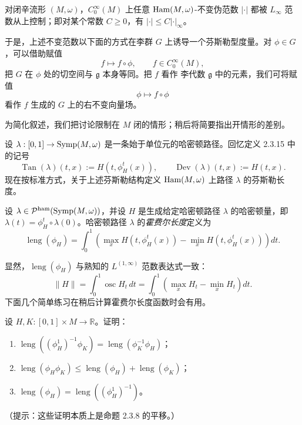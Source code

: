 \begin{theorem}\label{thm:buhovsky-ostrover-pseudonorm}
对闭辛流形 $(M,\omega)$，$C_0^\infty(M)$ 上任意
$\operatorname{Ham}(M,\omega)$-不变伪范数 $|\mathord\cdot|$ 都被 $L_\infty$ 范数从上控制；即对某个常数 $C\geq0$，有
$|\mathord\cdot|\leq C|\mathord\cdot|_\infty$。
\end{theorem}

于是，上述不变范数以下面的方式在李群 $G$ 上诱导一个芬斯勒型度量。对 $\phi\in G$，可以借助赋值
\[
 f\longmapsto f\circ\phi,
 \qquad f\in C_0^\infty(M),
\]
把 $G$ 在 $\phi$ 处的切空间与 $\mathfrak g$ 本身等同。把 $f$ 看作
李代数 $\mathfrak g$ 中的元素，我们可将赋值
\[
 \phi\longmapsto f\circ\phi
\]
看作 $f$ 生成的 $G$ 上的右不变向量场。

为简化叙述，我们把讨论限制在 $M$ 闭的情形；稍后将简要指出开情形的差别。

设 $\lambda:[0,1]\to\operatorname{Symp}(M,\omega)$ 是一条始于单位元的哈密顿路径。回忆定义 2.3.15 中的记号
\[
 \operatorname{Tan}(\lambda)(t,x)
 :=H(t,\phi_H^t(x)),
 \qquad
 \operatorname{Dev}(\lambda)(t,x):=H(t,x).
\]
现在按标准方式，关于上述芬斯勒结构定义 $\operatorname{Ham}(M,\omega)$ 上路径
$\lambda$ 的芬斯勒长度。

\begin{definition}\label{def:hofer-length}
设 $\lambda\in\mathcal P^{\mathrm{ham}}(\operatorname{Symp}(M,\omega))$，并设 $H$ 是生成给定哈密顿路径 $\lambda$ 的哈密顿量，即
$\lambda(t)=\phi_H^t\circ\lambda(0)$。哈密顿路径 $\lambda$ 的\emph{霍费尔长度}定义为
\begin{equation}
 \operatorname{leng}(\phi_H)
 =\int_0^1\left(
   \max_x H(t,\phi_H^t(x))-
   \min_x H(t,\phi_H^t(x))\right)dt.
 \label{eq:hofer-length}
\end{equation}
\end{definition}

显然，$\operatorname{leng}(\phi_H)$ 与熟知的 $L^{(1,\infty)}$ 范数表达式一致：
\[
 \|H\|=\int_0^1\operatorname{osc}H_t\,dt
 =\int_0^1\left(\max_xH_t-\min_xH_t\right)dt.
\]
下面几个简单练习在稍后计算霍费尔长度函数时会有用。

\begin{exercise}\label{ex:hofer-length-identities}
设 $H,K:[0,1]\times M\to\mathbb R$。证明：
\begin{enumerate}[label=(\arabic*)]
 \item $\operatorname{leng}((\phi_H^1)^{-1}\phi_K)
 =\operatorname{leng}(\phi_K^{-1}\phi_H)$；
 \item $\operatorname{leng}(\phi_H\phi_K)
 \leq\operatorname{leng}(\phi_H)+\operatorname{leng}(\phi_K)$；
 \item $\operatorname{leng}(\phi_H)
 =\operatorname{leng}((\phi_H^1)^{-1})$。
\end{enumerate}
（提示：这些证明本质上是命题 2.3.8 的平移。）
\end{exercise}


